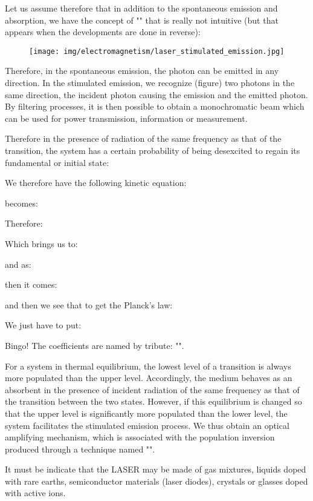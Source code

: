 	Let us assume therefore that in addition to the spontaneous  emission and absorption, we have the concept of "" that is really not intuitive (but that appears when the developments are done in reverse):
	\begin{figure}[H]
		\centering
		\texttt{[image: img/electromagnetism/laser\_stimulated\_emission.jpg]}
	\end{figure}
	Therefore, in the spontaneous emission, the photon can be emitted in any direction. In the stimulated emission, we recognize (figure) two photons in the same direction, the incident photon causing the emission and the emitted photon. By filtering processes, it is then possible to obtain a monochromatic beam which can be used for power transmission, information or measurement.

	Therefore in the presence of radiation of the same frequency as that of the transition, the system has a certain probability of being desexcited to regain its fundamental or initial state:
		
	We therefore have the following kinetic equation:
	
	becomes:
	
	Therefore:
	
	Which brings us to:
	
	and as:
	
	then it comes:
	
	and then we see that to get the Planck's law:
	
	We just have to put:
	
	Bingo! The coefficients are named by tribute: "".
	
	For a system in thermal equilibrium, the lowest level of a transition is always more populated than the upper level. Accordingly, the medium behaves as an absorbent in the presence of incident radiation of the same frequency as that of the transition between the two states. However, if this equilibrium is changed so that the upper level is significantly more populated than the lower level, the system facilitates the stimulated emission process. We thus obtain an optical amplifying mechanism, which is associated with the population inversion produced through a technique named "".

	It must be indicate that the LASER may be made of gas mixtures, liquids doped with rare earths, semiconductor materials (laser diodes), crystals or glasses doped with active ions.

